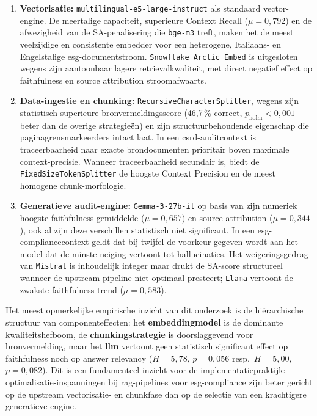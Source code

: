 \begin{enumerate}
  \item \textbf{Vectorisatie:} \texttt{multilingual-e5-large-instruct} als standaard vector-engine. De meertalige capaciteit, superieure Context Recall ($\mu = 0{,}792$) en de afwezigheid van de SA-penalisering die \texttt{bge-m3} treft, maken het de meest veelzijdige en consistente embedder voor een heterogene, Italiaans- en Engelstalige \gls{esg}-documentstroom. \texttt{Snowflake Arctic Embed} is uitgesloten wegens zijn aantoonbaar lagere retrievalkwaliteit, met direct negatief effect op faithfulness en source attribution stroomafwaarts.
  \item \textbf{Data-ingestie en chunking:} \texttt{RecursiveCharacterSplitter}, wegens zijn statistisch superieure bronvermeldingsscore (46{,}7\,\% correct, $p_{\text{holm}} < 0{,}001$ beter dan de overige strategieën) en zijn structuurbehoudende eigenschap die paginagrensmarkeerders intact laat. In een \gls{csrd}-auditcontext is traceerbaarheid naar exacte brondocumenten prioritair boven maximale context-precisie. Wanneer traceerbaarheid secundair is, biedt de \texttt{FixedSizeTokenSplitter} de hoogste Context Precision en de meest homogene chunk-morfologie.
  \item \textbf{Generatieve audit-engine:} \texttt{Gemma-3-27b-it} op basis van zijn numeriek hoogste faithfulness-gemiddelde ($\mu = 0{,}657$) en source attribution ($\mu = 0{,}344$), ook al zijn deze verschillen statistisch niet significant. In een \gls{esg}-compliancecontext geldt dat bij twijfel de voorkeur gegeven wordt aan het model dat de minste neiging vertoont tot hallucinaties. Het weigeringsgedrag van \texttt{Mistral} is inhoudelijk integer maar drukt de SA-score structureel wanneer de upstream pipeline niet optimaal presteert; \texttt{Llama} vertoont de zwakste faithfulness-trend ($\mu = 0{,}583$).
\end{enumerate}

Het meest opmerkelijke empirische inzicht van dit onderzoek is de hiërarchische structuur van componenteffecten: het \textbf{embeddingmodel} is de dominante kwaliteitshefboom, de \textbf{chunkingstrategie} is doorslaggevend voor bronvermelding, maar het \textbf{\gls{llm}} vertoont geen statistisch significant effect op faithfulness noch op answer relevancy ($H = 5{,}78$, $p = 0{,}056$ resp.\ $H = 5{,}00$, $p = 0{,}082$). Dit is een fundamenteel inzicht voor de implementatiepraktijk: optimalisatie-inspanningen bij \gls{rag}-pipelines voor \gls{esg}-compliance zijn beter gericht op de upstream vectorisatie- en chunkfase dan op de selectie van een krachtigere generatieve engine.

